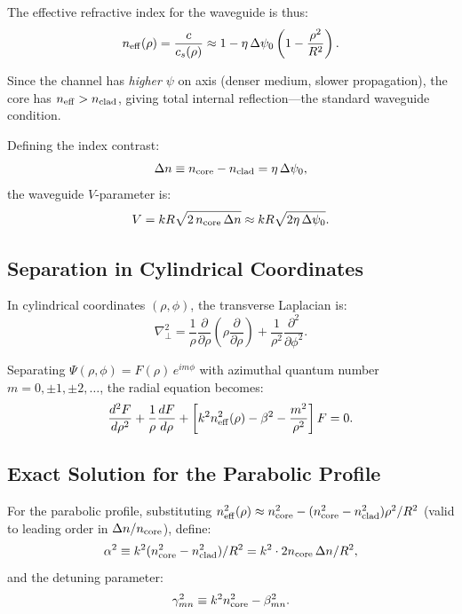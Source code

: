 \documentclass[twocolumn,superscriptaddress,prd]{revtex4-2}
\begin{document}
The effective refractive index for the waveguide is thus:
\begin{equation}
n_{\rm eff}(\rho) = \frac{c}{c_s(\rho)} \approx 1 - \eta\,\Delta\psi_0\left(1 - \frac{\rho^2}{R^2}\right).
\label{eq:neff-profile}
\end{equation}

Since the channel has \emph{higher} $\psi$ on axis (denser medium,
slower propagation), the core has $n_{\rm eff} > n_{\rm clad}$,
giving total internal reflection---the standard waveguide condition.

Defining the index contrast:
\begin{equation}
\Delta n \equiv n_{\rm core} - n_{\rm clad} = \eta\,\Delta\psi_0,
\label{eq:index-contrast}
\end{equation}
the waveguide $V$-parameter is:
\begin{equation}
V = kR\sqrt{2\,n_{\rm core}\,\Delta n} \approx kR\sqrt{2\eta\,\Delta\psi_0}.
\label{eq:V-param}
\end{equation}

\subsection{Separation in Cylindrical Coordinates}

In cylindrical coordinates $(\rho,\phi)$, the transverse Laplacian is:
\begin{equation}
\nabla_\perp^2 = \frac{1}{\rho}\frac{\partial}{\partial\rho}\left(\rho\frac{\partial}{\partial\rho}\right) + \frac{1}{\rho^2}\frac{\partial^2}{\partial\phi^2}.
\end{equation}

Separating $\Psi(\rho,\phi) = F(\rho)\,e^{im\phi}$ with azimuthal
quantum number $m = 0, \pm 1, \pm 2, \ldots$, the radial equation becomes:
\begin{equation}
\frac{d^2F}{d\rho^2} + \frac{1}{\rho}\frac{dF}{d\rho}
+ \left[k^2 n_{\rm eff}^2(\rho) - \beta^2 - \frac{m^2}{\rho^2}\right]F = 0.
\label{eq:radial}
\end{equation}

\subsection{Exact Solution for the Parabolic Profile}

For the parabolic profile, substituting
$n_{\rm eff}^2(\rho) \approx n_{\rm core}^2 - (n_{\rm core}^2 - n_{\rm clad}^2)\rho^2/R^2$
(valid to leading order in $\Delta n/n_{\rm core}$), define:
\begin{equation}
\alpha^2 \equiv k^2(n_{\rm core}^2 - n_{\rm clad}^2)/R^2 = k^2 \cdot 2n_{\rm core}\,\Delta n/R^2,
\end{equation}
and the detuning parameter:
\begin{equation}
\gamma_{mn}^2 \equiv k^2 n_{\rm core}^2 - \beta_{mn}^2.
\end{equation}
\end{document}
